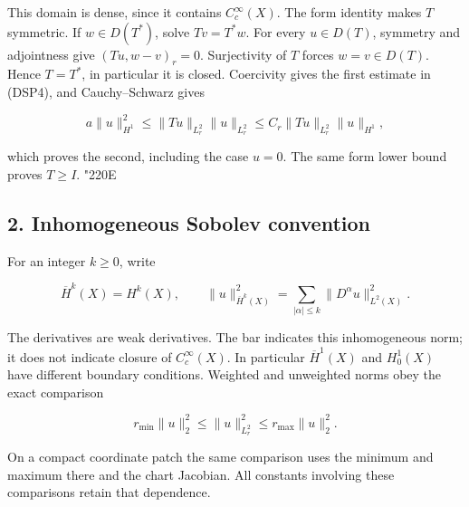 \documentclass[
  11pt,
]{article}
\makeatletter
\let\ReaderOriginalAnchorStart\hyper@anchorstart
\let\ReaderOriginalAnchorEnd\hyper@anchorend
\let\ReaderPendingAliases\@empty
\def\ReaderArmAliases#1{\gdef\ReaderPendingAliases{#1}}
\def\hyper@anchorstart#1{\ReaderIfNativeAnchorTF{#1}{\ReaderPendingAliases\global\let\ReaderPendingAliases\@empty}{}\ReaderOriginalAnchorStart{#1}}
\makeatother
\begin{document}
This domain is dense, since it contains \(C_c^\infty(X)\). The form
identity makes \(T\) symmetric. If \(w\in D(T^*)\), solve \(Tv=T^*w\).
For every \(u\in D(T)\), symmetry and adjointness give \((Tu,w-v)_r=0\).
Surjectivity of \(T\) forces \(w=v\in D(T)\). Hence \(T=T^*\), in
particular it is closed. Coercivity gives the first estimate in (DSP4),
and Cauchy--Schwarz gives

\[
 a\|u\|_{H^1}^2\leq\|Tu\|_{L^2_r}\|u\|_{L^2_r}
 \leq C_r\|Tu\|_{L^2_r}\|u\|_{H^1},
\]

which proves the second, including the case \(u=0\). The same form lower
bound proves \(T\geq I\). {\ReaderSymbols\char"220E}

\ReaderArmAliases{\ReaderOriginalAnchorStart{AN03-DSP-002}\ReaderOriginalAnchorEnd\begingroup\expandafter\def\csname @currentHref\endcsname{AN03-DSP-002}\label{AN03-DSP-002}\endgroup\ReaderOriginalAnchorStart{an03-dsp-002-inhomogeneous-sobolev-convention}\ReaderOriginalAnchorEnd\begingroup\expandafter\def\csname @currentHref\endcsname{an03-dsp-002-inhomogeneous-sobolev-convention}\label{an03-dsp-002-inhomogeneous-sobolev-convention}\endgroup\ReaderOriginalAnchorStart{2-inhomogeneous-sobolev-convention}\ReaderOriginalAnchorEnd\begingroup\expandafter\def\csname @currentHref\endcsname{2-inhomogeneous-sobolev-convention}\label{2-inhomogeneous-sobolev-convention}\endgroup\ReaderOriginalAnchorStart{inhomogeneous-sobolev-convention}\ReaderOriginalAnchorEnd}
\subsection{2. Inhomogeneous Sobolev
convention}\label{inhomogeneous-sobolev-convention}

For an integer \(k\geq0\), write

\[
 \overline H^k(X)=H^k(X),\qquad
 \|u\|_{\overline H^k(X)}^2=\sum_{|\alpha|\leq k}\|D^\alpha u\|_{L^2(X)}^2.
 \tag{DSP6}
\]

The derivatives are weak derivatives. The bar indicates this
inhomogeneous norm; it does not indicate closure of \(C_c^\infty(X)\).
In particular \(\overline H^1(X)\) and \(H_0^1(X)\) have different
boundary conditions. Weighted and unweighted norms obey the exact
comparison

\[
 r_{\min}\|u\|_2^2\leq\|u\|_{L^2_r}^2\leq r_{\max}\|u\|_2^2.
 \tag{DSP7}
\]

On a compact coordinate patch the same comparison uses the minimum and
maximum there and the chart Jacobian. All constants involving these
comparisons retain that dependence.
\end{document}
